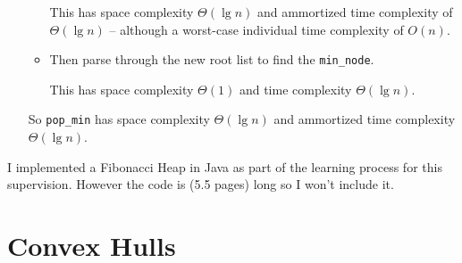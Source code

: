\documentclass[10pt,\jkfside,a4paper]{article}
\begin{document}
\begin{enumerate}
\begin{itemize}
This has space complexity $\Theta(\lg n)$ and ammortized time complexity of $\Theta(\lg n)$ -- although a 
worst-case individual time complexity of $O(n)$.

\item Then parse through the new root list to find the {\tt min\_node}.

This has space complexity $\Theta(1)$ and time complexity $\Theta(\lg n)$.

\end{itemize}

So {\tt pop\_min} has space complexity $\Theta(\lg n)$ and ammortized time complexity $\Theta(\lg n)$.

\end{enumerate}

I implemented a Fibonacci Heap in Java as part of the learning process for this supervision. 
However the code is (5.5 pages) long so I won't include it.

\newpage

\section{Convex Hulls}
\end{document}
